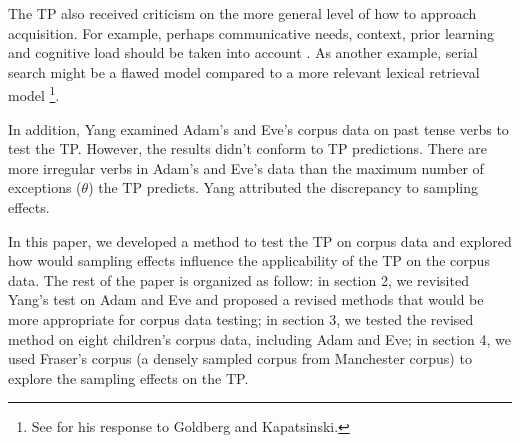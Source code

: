 The TP also received criticism on the more general level of how to approach acquisition. For example, perhaps communicative needs, context, prior learning and cognitive load should be taken into account \citep{goldberg2018sufficiency}. As another example, serial search might be a flawed model compared to a more relevant lexical retrieval model \citep{kapatsinski2018intolerance}\footnote{See \cite{yang2018some} for his response to Goldberg and Kapatsinski.}.

In addition, Yang examined Adam's and Eve's corpus data on past tense verbs to test the TP. However, the results didn't conform to TP predictions. There are more irregular verbs in Adam's and Eve's data than the maximum number of exceptions ($\theta$) the TP predicts. Yang attributed the discrepancy to sampling effects. 


In this paper, we developed a method to test the TP on corpus data and explored how would sampling effects influence the applicability of the TP on the corpus data. The rest of the paper is organized as follow: in section 2, we revisited Yang's test on Adam and Eve and proposed a revised methods that would be more appropriate for corpus data testing; in section 3, we tested the revised method on eight children's corpus data, including Adam and Eve; in section 4, we used Fraser's corpus (a densely sampled corpus from Manchester corpus) to explore the sampling effects on the TP. 


